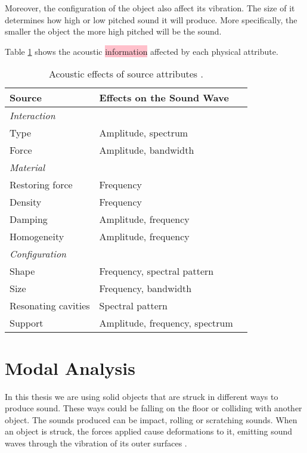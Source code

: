 Moreover, the configuration of the object also affect its vibration. The size of it determines how high or low pitched sound it will produce. More specifically, the smaller the object the more high pitched will be the sound.  

Table \ref{tab:acoustic_effects} shows the acoustic \colorbox{pink}{information} affected by each physical attribute. 

\begin{table}[H]
	\centering
    \begin{tabular}{ | l | l | p{5cm} |}
    \hline
    \textbf{Source} & \textbf{Effects on the Sound Wave} \\ \hline
    \emph{Interaction} &  \\ 
    \hspace{8pt} Type & Amplitude, spectrum \\ 
    \hspace{8pt} Force & Amplitude, bandwidth \\
    \hline
    \emph{Material} &  \\ 
    \hspace{8pt} Restoring force & Frequency \\ 
    \hspace{8pt} Density & Frequency \\
    \hspace{8pt} Damping & Amplitude, frequency \\
    \hspace{8pt} Homogeneity & Amplitude, frequency \\
    \hline
    \emph{Configuration} &  \\ 
    \hspace{8pt} Shape & Frequency, spectral pattern \\ 
    \hspace{8pt} Size & Frequency, bandwidth \\
    \hspace{8pt} Resonating cavities & Spectral pattern \\
    \hspace{8pt} Support & Amplitude, frequency, spectrum \\
    \hline
    \end{tabular}
    \caption{Acoustic effects of source attributes \cite{gaver1993world}.}
    \label{tab:acoustic_effects}
\end{table}



\section{Modal Analysis}\label{sec:modal_analysis}
In this thesis we are using solid objects that are struck in different ways to produce sound. These ways could be falling on the floor or colliding with another object. The sounds produced can be impact, rolling or scratching sounds. When an object is struck, the forces applied cause deformations to it, emitting sound waves through the vibration of its outer surfaces \cite{van2001foleyautomatic}.

